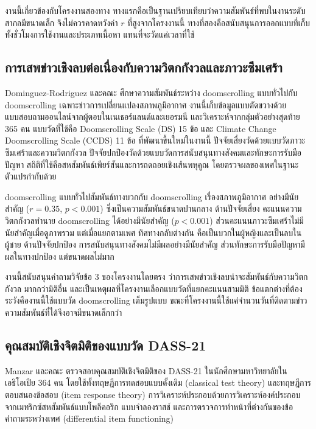 งานนี้เกี่ยวข้องกับโครงงานสองทาง ทางแรกคือเป็นฐานเปรียบเทียบว่าความสัมพันธ์ที่พบในงานระดับสากลมีขนาดเล็ก
จึงไม่ควรคาดหวังค่า $r$ ที่สูงจากโครงงานนี้
ทางที่สองคือสนับสนุนการออกแบบที่เก็บทั้งชั่วโมงการใช้งานและประเภทเนื้อหา
แทนที่จะวัดแค่เวลาที่ใช้

\subsection{การเสพข่าวเชิงลบต่อเนื่องกับความวิตกกังวลและภาวะซึมเศร้า}

Dominguez-Rodriguez และคณะ \cite{dominguez2025climate} ศึกษาความสัมพันธ์ระหว่าง doomscrolling
แบบทั่วไปกับ doomscrolling เฉพาะข่าวการเปลี่ยนแปลงสภาพภูมิอากาศ
งานนี้เก็บข้อมูลแบบตัดขวางด้วยแบบสอบถามออนไลน์จากผู้ตอบในเนเธอร์แลนด์และเยอรมนี
และวิเคราะห์จากกลุ่มตัวอย่างสุดท้าย 365 คน
แบบวัดที่ใช้คือ Doomscrolling Scale (DS) 15 ข้อ และ Climate Change Doomscrolling Scale (CCDS) 11 ข้อ
ที่พัฒนาขึ้นใหม่ในงานนี้ ปัจจัยเสี่ยงวัดด้วยแบบวัดภาวะซึมเศร้าและความวิตกกังวล
ปัจจัยปกป้องวัดด้วยแบบวัดการสนับสนุนทางสังคมและทักษะการรับมือปัญหา
สถิติที่ใช้คือสหสัมพันธ์เพียร์สันและการถดถอยเชิงเส้นพหุคูณ โดยตรวจผลของเพศในฐานะตัวแปรกำกับด้วย

doomscrolling แบบทั่วไปสัมพันธ์ทางบวกกับ doomscrolling เรื่องสภาพภูมิอากาศ
อย่างมีนัยสำคัญ ($r = 0.35$, $p < 0.001$) ซึ่งเป็นความสัมพันธ์ขนาดปานกลาง
ด้านปัจจัยเสี่ยง คะแนนความวิตกกังวลทำนาย doomscrolling ได้อย่างมีนัยสำคัญ ($p < 0.001$)
ส่วนคะแนนภาวะซึมเศร้าไม่มีนัยสำคัญเมื่อดูภาพรวม
แต่เมื่อแยกตามเพศ ทิศทางกลับต่างกัน คือเป็นบวกในผู้หญิงและเป็นลบในผู้ชาย
ด้านปัจจัยปกป้อง การสนับสนุนทางสังคมไม่มีผลอย่างมีนัยสำคัญ
ส่วนทักษะการรับมือปัญหามีผลในทางปกป้อง แต่ขนาดผลไม่มาก

งานนี้สนับสนุนคำถามวิจัยข้อ 3 ของโครงงานโดยตรง ว่าการเสพข่าวเชิงลบน่าจะสัมพันธ์กับความวิตกกังวล
มากกว่ามิติอื่น และเป็นเหตุผลที่โครงงานเลือกแบบวัดที่แยกคะแนนสามมิติ
ข้อแตกต่างที่ต้องระวังคืองานนี้ใช้แบบวัด doomscrolling เต็มรูปแบบ
ขณะที่โครงงานนี้ใช้แค่จำนวนวันที่ติดตามข่าว ความสัมพันธ์ที่ได้จึงอาจมีขนาดเล็กกว่า

\subsection{คุณสมบัติเชิงจิตมิติของแบบวัด DASS-21}

Manzar และคณะ \cite{manzar2025dass21} ตรวจสอบคุณสมบัติเชิงจิตมิติของ DASS-21
ในนักศึกษามหาวิทยาลัยในเอธิโอเปีย 364 คน
โดยใช้ทั้งทฤษฎีการทดสอบแบบดั้งเดิม (classical test theory) และทฤษฎีการตอบสนองข้อสอบ (item response theory)
การวิเคราะห์ประกอบด้วยการวิเคราะห์องค์ประกอบจากเมทริกซ์สหสัมพันธ์แบบโพลีคอริก แบบจำลองราสช์
และการตรวจการทำหน้าที่ต่างกันของข้อคำถามระหว่างเพศ (differential item functioning)

